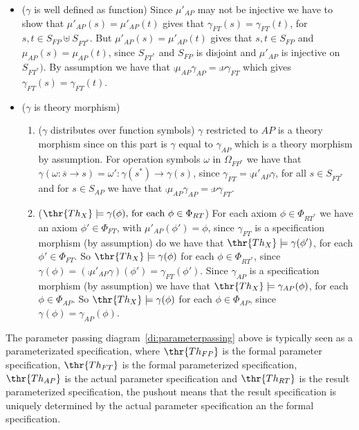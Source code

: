 \begin{PROOF}
\begin{enumerate}
		\begin{itemize}
		\item ($\gamma$ is well defined as function) Since $\mu'_{AP}$ may not be injective we have to show that $\mu'_{AP}(s) =\mu'_{AP}(t)$ gives that $\gamma_{FT}(s) = \gamma_{FT}(t)$, for $s,t \in S_{FP} \uplus S_{FT^*}$. But $\mu'_{AP}(s) =\mu'_{AP}(t)$ gives that $s,t \in S_{FP}$ and $\mu_{AP}(s) =\mu_{AP}(t)$, since $S_{FT^*}$ and $S_{FP}$ is disjoint and $\mu'_{AP}$ is  injective on $S_{FT^*})$. By assumption we have that $\comp{\mu_{AP}}{\gamma_{AP}} = \comp{\nu}{\gamma_{FT}}$ which gives $\gamma_{FT}(s) = \gamma_{FT}(t)$.
		\item ($\gamma$ is theory morphism) 
			\begin{enumerate}
			\item ($\gamma$ distributes over function symbols) $\gamma$ restricted to $AP$ is a theory morphism since on this part is $\gamma$ equal to $\gamma_{AP}$ which is a theory morphism by assumption. For operation symbols $\omega$ in $\Omega_{FP^*}$ we have that $\gamma(\omega:\overline{s} \to s) = \omega':\gamma(s^*) \to \gamma(s)$, since $\gamma_{FT} = \comp{\mu'_{AP}}{\gamma}$, for all $s \in S_{FT^*}$ and for $s \in S_{AP}$ we have that $\comp{\mu_{AP}}{\gamma_{AP}} = \comp{\nu}{\gamma_{FT}}$. 
			\item ($\thr{Th_X} \models \gamma(\phi)\mbox{, for each } \phi \in \Phi_{RT}$) For each axiom $\phi \in \Phi_{RT^*}$ we have an axiom $\phi' \in \Phi_{FT}$, with $\mu'_{AP}(\phi')= \phi$, since $\gamma_{FT}$ is a specification morphism (by assumption) do we have that $\thr{Th_X} \models \gamma(\phi')$, for each $\phi' \in \Phi_{FT}$. So $\thr{Th_X} \models \gamma(\phi)$ for each $\phi \in \Phi_{RT^*}$, since $\gamma(\phi) = (\comp{\mu'_{AP}}{\gamma})(\phi') = \gamma_{FT}(\phi')$.
Since $\gamma_{AP}$ is a specification morphism (by assumption) we have that $\thr{Th_X} \models \gamma_{AP}(\phi)$, for each $\phi \in \Phi_{AP}$. So $\thr{Th_X} \models \gamma(\phi)$ for each $\phi \in \Phi_{AP}$, since $\gamma(\phi) = {\gamma}_{AP}(\phi)$. 
			\end{enumerate} 
		\end{itemize}
	\end{enumerate} 
\end{PROOF}

The parameter passing diagram~\ref{di:parameterpassing} above is typically seen as a parameterizated specification, where $\thr{Th_{FP}}$ is the formal parameter specification, $\thr{Th_{FT}}$ is the formal parameterized specification, $\thr{Th_{AP}}$ is the actual parameter specification and $\thr{Th_{RT}}$ is the result parameterized specification, the pushout means that the result specification is uniquely determined by the actual parameter specification an the formal specification.

